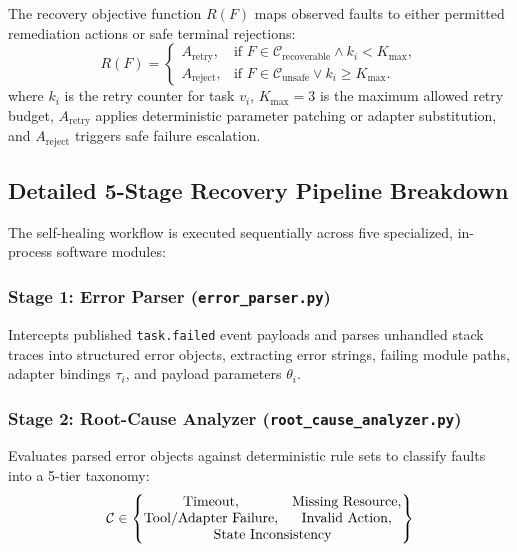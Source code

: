 \documentclass[conference]{IEEEtran}
\begin{document}
The recovery objective function $R(F)$ maps observed faults to either permitted remediation actions or safe terminal rejections:
\begin{equation}
R(F) =
\begin{cases}
A_{\text{retry}}, & \text{if } F \in \mathcal{C}_{\text{recoverable}} \land k_i < K_{\text{max}}, \\
A_{\text{reject}}, & \text{if } F \in \mathcal{C}_{\text{unsafe}} \lor k_i \ge K_{\text{max}}.
\end{cases}
\end{equation}
where $k_i$ is the retry counter for task $v_i$, $K_{\text{max}} = 3$ is the maximum allowed retry budget, $A_{\text{retry}}$ applies deterministic parameter patching or adapter substitution, and $A_{\text{reject}}$ triggers safe failure escalation.

\subsection{Detailed 5-Stage Recovery Pipeline Breakdown}
The self-healing workflow is executed sequentially across five specialized, in-process software modules:

\subsubsection{Stage 1: Error Parser (\texttt{error\_parser.py})}
Intercepts published \texttt{task.failed} event payloads and parses unhandled stack traces into structured error objects, extracting error strings, failing module paths, adapter bindings $\tau_i$, and payload parameters $\theta_i$.

\subsubsection{Stage 2: Root-Cause Analyzer (\texttt{root\_cause\_analyzer.py})}
Evaluates parsed error objects against deterministic rule sets to classify faults into a 5-tier taxonomy:
\begin{equation}
\mathcal{C} \in
\begin{Bmatrix}
\text{Timeout}, & \text{Missing Resource}, \\
\text{Tool/Adapter Failure}, & \text{Invalid Action}, \\
\multicolumn{2}{c}{\text{State Inconsistency}}
\end{Bmatrix}
\end{equation}
\end{document}
